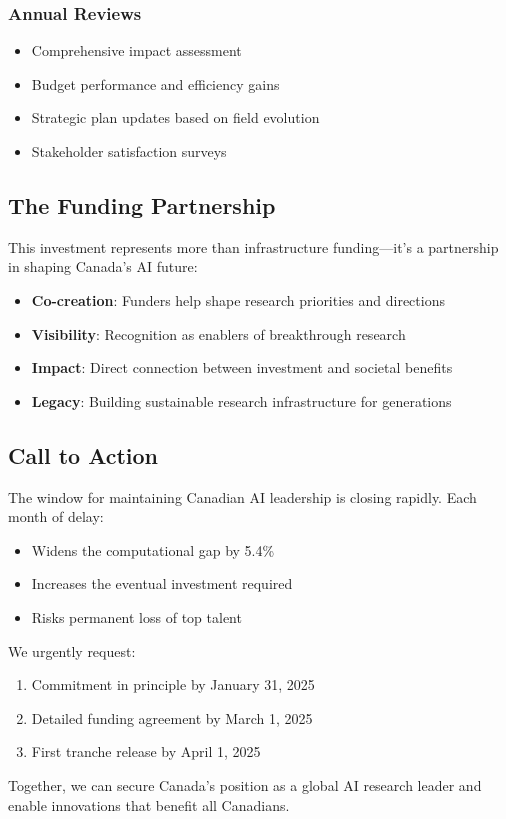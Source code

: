 \subsubsection{Annual Reviews}
\begin{itemize}
\item Comprehensive impact assessment
\item Budget performance and efficiency gains
\item Strategic plan updates based on field evolution
\item Stakeholder satisfaction surveys
\end{itemize}

\subsection{The Funding Partnership}

This investment represents more than infrastructure funding---it's a partnership in shaping Canada's AI future:

\begin{itemize}
\item \textbf{Co-creation}: Funders help shape research priorities and directions
\item \textbf{Visibility}: Recognition as enablers of breakthrough research
\item \textbf{Impact}: Direct connection between investment and societal benefits
\item \textbf{Legacy}: Building sustainable research infrastructure for generations
\end{itemize}

\subsection{Call to Action}

The window for maintaining Canadian AI leadership is closing rapidly. Each month of delay:
\begin{itemize}
\item Widens the computational gap by 5.4\%
\item Increases the eventual investment required
\item Risks permanent loss of top talent
\end{itemize}

We urgently request:
\begin{enumerate}
\item Commitment in principle by January 31, 2025
\item Detailed funding agreement by March 1, 2025
\item First tranche release by April 1, 2025
\end{enumerate}

Together, we can secure Canada's position as a global AI research leader and enable innovations that benefit all Canadians.
